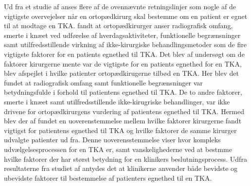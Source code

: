 Ud fra et studie af \cite{skou2016} anses flere af de ovennævnte retningslinjer som nogle af de vigtigste overvejelser når en ortopædkirurg skal bestemme om en patient er egnet til at modtage en TKA. \cite{skou2016} fandt at ortopædkirurger anser radiografisk omfang, smerte i knæet ved udførelse af hverdagsaktiviteter, funktionelle begrænsninger samt utilfredsstillende virkning af ikke-kirurgiske behandlingsmetoder som de fire vigtigste faktorer for en patients egnethed til TKA. Det blev af \cite{skou2016} undersøgt om de faktorer kirurgerne mente var de vigtigste for en patients egnethed for en TKA, blev afspejlet i hvilke patienter ortopædkirugerne tilbød en TKA. Her blev det fundet at radiografisk omfang samt funktionelle begrænsninger var betydningsfulde i forhold til patientens egnethed til TKA. De to andre faktorer, smerte i knæet samt utilfredsstillende ikke-kirugriske behandlinger, var ikke drivene for ortopædkirurgens vurdering af patientens egnethed til TKA. Hermed blev der af \cite{skou2016} fundet en uoverenstemmelse mellem hvilke faktorer kirurgerne fandt vigtigst for patientens egnethed til TKA og hvilke faktorer de samme kirurger udvalgte patienter ud fra. Denne uoverensstemmelse viser hvor kompleks udvælgelsesprocessen for en TKA er, samt vanskelighederne ved at bestmme hvilke faktorer der har størst betydning for en klinikers beslutningsprocess. Udfra resultaterne fra studiet af \cite{skou2016} antydes det at klinikerne anvender både bevidste og ubevidste faktorer til bestemmelse af patienters egnethed til en TKA.    
    

